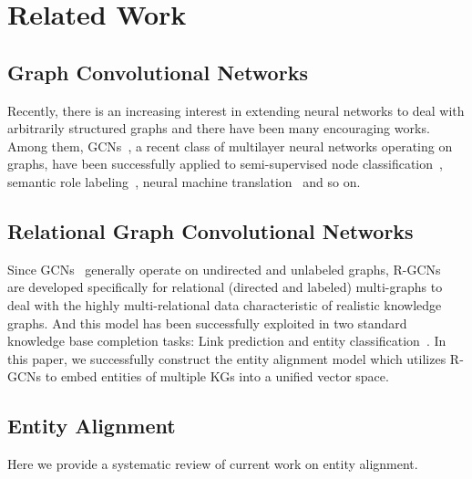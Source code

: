 
	
	\section{Related Work}
	\subsection{Graph Convolutional Networks}
	Recently, there is an increasing interest in extending neural networks to deal with arbitrarily structured graphs and there have been many encouraging works. Among them, GCNs~\cite{Duvenaud2015Convolutional,Kipf2016Semi,Kearnes2016Molecular}, a recent class of multilayer neural networks operating on graphs, have been successfully applied to semi-supervised node classification~\cite{Kipf2016Semi}, semantic role labeling~\cite{Marcheggiani2017Encoding}, neural machine translation~\cite{Bastings2017Graph} and so on. %
	\subsection{Relational Graph Convolutional Networks}
	Since GCNs~\cite{Kipf2016Semi} generally operate on undirected and unlabeled graphs, R-GCNs~\cite{Schlichtkrull2017Modeling} are developed specifically for relational (directed and labeled) multi-graphs to deal with the highly multi-relational data characteristic of realistic knowledge graphs. And this model has been successfully exploited in two standard knowledge base completion tasks: Link prediction and entity classification~\cite{Schlichtkrull2017Modeling}. In this paper, we successfully construct the entity alignment model which utilizes R-GCNs to embed entities of multiple KGs into a unified vector space.
	
	\subsection{Entity Alignment}
	
	Here we provide a systematic review of current work on entity alignment.
	
